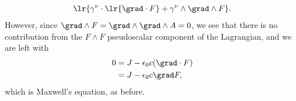 {\begin{equation}
\begin{aligned}
   \lr{
      \gamma^\nu \cdot \lr{ \grad \cdot F } + \gamma^\nu \wedge \grad \wedge F
   }.
\end{aligned}
\end{equation}
However, since \( \grad \wedge F = \grad \wedge \grad \wedge A = 0 \), we see that there is no contribution from the \( F \wedge F \) pseudoscalar component of the Lagrangian, and we are left with
\begin{equation}\label{eqn:maxwells:2100}
\begin{aligned}
0 &= J - \epsilon_0 c (\grad \cdot F) \\
  &= J - \epsilon_0 c \grad F,
\end{aligned}
\end{equation}
which is Maxwell's equation, as before.
} %
